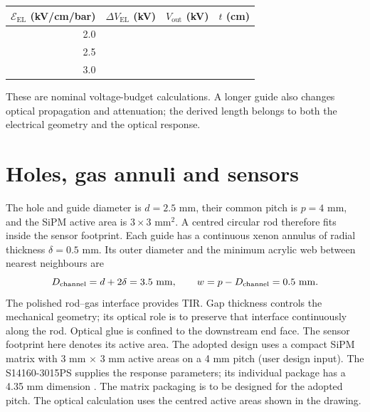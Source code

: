 \documentclass[11pt,a4paper]{article}
\newcommand{\num}[2][3]{\pgfmathprintnumber[fixed,precision=#1,fixed zerofill]{#2}}
\newcommand{\EP}{\mathcal{E}_{\mathrm{EL}}}
\begin{document}
\begin{center}
\begin{tabular}{rrrr}
\toprule
$\EP$ (kV/cm/bar) & $\Delta V_{\mathrm{EL}}$ (kV) & $V_{\mathrm{out}}$ (kV) & $t$ (cm)\\
\midrule
2.0 & \num[2]{\elmTwoELDrop} & \num[2]{\elmTwoExit} & \num{\elmTwoLength}\\
2.5 & \num[2]{\elmTwoHalfELDrop} & \num[2]{\elmTwoHalfExit} & \num{\elmTwoHalfLength}\\
3.0 & \num[2]{\elmThreeELDrop} & \num[2]{\elmThreeExit} & \num{\elmThreeLength}\\
\bottomrule
\end{tabular}
\end{center}
These are nominal voltage-budget calculations. A longer guide also changes
optical propagation and attenuation; the derived length belongs to both the
electrical geometry and the optical response.

\section{Holes, gas annuli and sensors}
The hole and guide diameter is $d=2.5$ mm, their common pitch is $p=4$ mm,
and the SiPM active area is $3\times3$ mm$^2$. A centred circular rod therefore
fits inside the sensor footprint. Each guide has a continuous xenon annulus
of radial thickness $\delta=0.5$ mm. Its outer diameter and the minimum acrylic
web between nearest neighbours are
\begin{equation}
 D_{\mathrm{channel}}=d+2\delta=\num[1]{\elmChannelDiameterMM}\ \mathrm{mm},
 \qquad w=p-D_{\mathrm{channel}}=\num[1]{\elmWebMM}\ \mathrm{mm}.
\end{equation}
The polished rod--gas interface provides TIR. Gap thickness controls the
mechanical geometry; its optical role is to preserve that interface continuously
along the rod. Optical glue is confined to the downstream end face.
The sensor footprint here denotes its active area. The adopted design uses a
compact SiPM matrix with 3 mm $\times$ 3 mm active areas on a 4 mm pitch
(user design input). The S14160-3015PS supplies the response parameters;
its individual package has a 4.35 mm dimension
\cite{HamamatsuS14160SmallCells}. The matrix packaging is to be designed for
the adopted pitch. The optical calculation uses the centred active areas
shown in the drawing.
\end{document}
